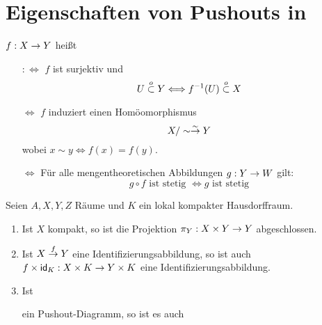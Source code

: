 \section{Eigenschaften von Pushouts in \Top}
$f : X \overset{}{\rightarrow} Y$ heißt 
\begin{itemize}
\item[$:\Leftrightarrow$] $f$ ist surjektiv und
\[U \overset{o}{\subset} Y \Longleftrightarrow f^{-1}(U) \overset{o}{\subset} X\]
\item[$\Leftrightarrow$] $f$ induziert einen Homöomorphismus
\[X/\sim \overset{\sim}{\rightarrow} Y\]
wobei $x\sim y \Leftrightarrow f(x) = f(y)$.
\item[$\Leftrightarrow$] Für alle mengentheoretischen Abbildungen $g : Y \overset{}{\rightarrow} W$ gilt:
\[g\circ f \text{ ist stetig } \Longleftrightarrow g \text{ ist stetig}\]
\end{itemize}

\Satz{}
Seien $A,X,Y,Z$ Räume und $K$ ein lokal kompakter Hausdorffraum.
\begin{enumerate}
\item Ist $X$ kompakt, so ist die Projektion $\pi_Y : X\times Y \overset{}{\rightarrow} Y$ abgeschlossen.
\item Ist $X\overset{f}{\rightarrow} Y$ eine Identifizierungsabbildung, so ist auch $f\times \textsf{id}_{K} : X \times K \overset{}{\rightarrow} Y \times K$ eine Identifizierungsabbildung.
\item Ist
\begin{center}
\end{center}
ein Pushout-Diagramm, so ist es auch
\begin{center}
\end{center}
\end{enumerate}

